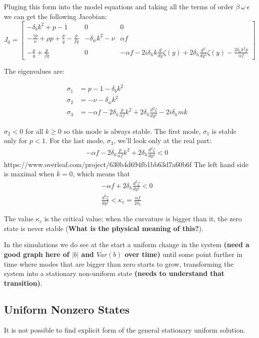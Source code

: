 Pluging this form into the model equations and taking all the terms of order $\beta~\omega~\epsilon$ we can get the following Jacobian:
\[
J_0 = \left[\begin{matrix}- \delta_{b} k^{2} + p - 1 & 0 & 0\\- \frac{\gamma p}{\nu} + \rho p + \frac{p}{q} - \frac{p}{f q} & - \delta_{w} k^{2} - \nu & \alpha f\\- \frac{p}{q} + \frac{p}{f q} & 0 & - \alpha f - 2 i \delta_{h} k \frac{d}{d y} \zeta{\left(y \right)} + 2 \delta_{h} \frac{d^{2}}{d y^{2}} \zeta{\left(y \right)} - \frac{2 \delta_{h} k^{2} p}{\alpha f}\end{matrix}\right]
\]

The eigenvalues are:

\begin{align*}
\sigma_{1} & =p-1-\delta_{b}k^{2}\\
\sigma_{2} & =-\nu-\delta_{w}k^{2}\\
\sigma_{3} & =-\alpha f-2\delta_{h}\frac{p}{\alpha f}k^{2}+2\delta_h\frac{d^2\zeta}{dy^2}-2i\delta_{h}mk
\end{align*}

$\sigma_2<0$ for all $k\geq0$ so this mode is always stable. The first mode, $\sigma_1$ is stable only for $p<1$. For the last mode, $\sigma_3$, we'll look only at the real part:
\begin{align*}
    -\alpha f - 2 \delta_h \frac{p}{\alpha f}k^2 + 2\delta_h\frac{d^2\zeta}{dy^2} < 0
\end{align*}https://www.overleaf.com/project/630b4d694fb1bb63d7a60b6f
The left hand side is maximal when $k=0$, which means that
\begin{align*}
    -\alpha f + 2\delta_h\frac{d^2\zeta}{dy^2} < 0 \\
    \frac{d^2 \zeta}{dy^2} < \kappa_c = \frac{\alpha f}{2\delta_h}
\end{align*}

The value $\kappa_c$ is the critical value; when the curvature is bigger than it, the zero state is never stable (\textbf{What is the physical meaning of this?}).

In the simulations we do see at the start a uniform change in the
system \textbf{(need a good graph here of $\left|b\right|$ and $Var\left(b\right)$
over time)} until some point further in time where modes that are
bigger than zero starts to grow, transforming the system into a stationary
non-uniform state \textbf{(needs to understand that transition)}.

\subsection{Uniform Nonzero States}
It is not possible to find explicit form of the general stationary uniform solution.
